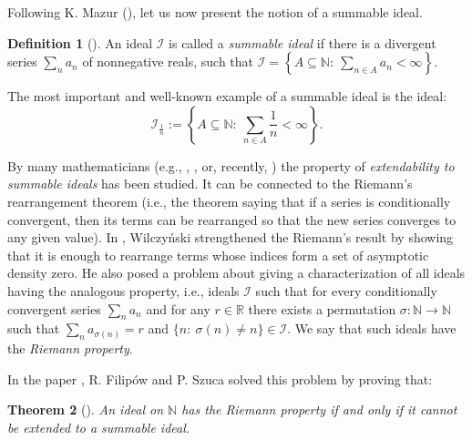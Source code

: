 \documentclass{amsart}
\newtheorem{thm}{Theorem}[section]
\theoremstyle{definition}
\newtheorem{problem}[thm]{Problem}
\newtheorem{df}[thm]{Definition}
\theoremstyle{definition}
\newcommand{\N}{{\mathbb N}}
\newcommand{\R}{{\mathbb R}}
\newcommand{\I}{\mathcal I}
\begin{document}


Following K. Mazur (\cite{Maz}), let us now present the notion of a summable ideal.
\begin{df}[\cite{Maz}]
An ideal $\I$ is called a \emph{summable ideal} if there is a divergent series $\sum_{n}{a_n}$ of nonnegative reals, such that $\I=\left\{A\subseteq \N :\ \sum_{n\in A}{a_n} <\infty\right\}$.
\end{df}
The most important and well-known example of a summable ideal is the ideal:  
$$\I_{\frac{1}{n}} := \left\{A\subseteq \N :\ \sum_{n\in A}{\frac{1}{n}} <\infty\right\}.$$

By many mathematicians (e.g., \cite{Au}, \cite{FreedSem}, or, recently, \cite{Klinga}) the property of \emph{extendability to summable ideals} has been studied. It can be connected to the Riemann's rearrangement theorem (i.e., the theorem saying that if a series is conditionally convergent, then its terms can be rearranged so that the new series converges to any given value). In \cite{W}, Wilczy\'nski strengthened the Riemann's result by showing that it is enough to rearrange terms whose indices form a set of asymptotic density zero. He also posed a problem about giving a characterization of all ideals having the analogous property, i.e., ideals $\I$ such that for every conditionally convergent series $\sum_n{a_n}$ and for any $r\in\R$ there exists a permutation $\sigma \colon \N\to\N$ such that $\sum_n{a_{\sigma(n)}} = r$ and $\{n :\ \sigma(n)\neq n\}\in\I$. We say that such ideals have the \emph{Riemann property}.

In the paper \cite{H3}, R. Filip\'ow and P. Szuca solved this problem by proving that:
\begin{thm}[{\cite[Theorem 3.3]{H3}}]
An ideal on $\N$ has the Riemann property if and only if it cannot be extended to a summable ideal.
\end{thm}
\end{document}
